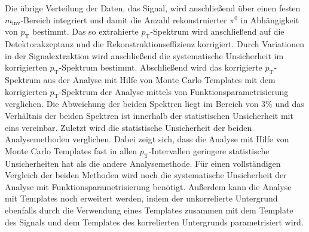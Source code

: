 Die übrige Verteilung der Daten, das Signal, wird anschließend über einen festen $m_\text{inv}$-Bereich integriert und damit die Anzahl rekonstruierter $\pi^{0}$ in Abhängigkeit von $p_\text{T}$ bestimmt.
\newline
Das so extrahierte $p_\text{T}$-Spektrum wird anschließend auf die Detektorakzeptanz und die Rekonstruktionseffizienz korrigiert.
Durch Variationen in der Signalextraktion wird anschließend die systematische Unsicherheit im korrigierten $p_\text{T}$-Spektrum bestimmt.
\newline
Abschließend wird das korrigierte $p_\text{T}$-Spektrum aus der Analyse mit Hilfe von Monte Carlo Templates mit dem korrigierten $p_\text{T}$-Spektrum der Analyse mittels von Funk\-ti\-ons\-pa\-ra\-me\-tri\-sie\-rung verglichen.
Die Abweichung der beiden Spektren liegt im Bereich von $3\%$ und das Verhältnis der beiden Spektren ist innerhalb der statistischen Unsicherheit mit eins vereinbar.
Zuletzt wird die statistische Unsicherheit der beiden Analysemethoden verglichen.
Dabei zeigt sich, dass die Analyse mit Hilfe von Monte Carlo Templates fast in allen $p_\text{T}$-Intervallen geringere statistische Unsicherheiten hat als die andere Analysemethode.
\newline
Für einen vollständigen Vergleich der beiden Methoden wird noch die systematische Unsicherheit der Analyse mit Funktionsparametrisierung benötigt.
Außerdem kann die Analyse mit Templates noch erweitert werden, indem der unkorrelierte Untergrund ebenfalls durch die Verwendung eines Templates zusammen mit dem Template des Signals und dem Templates des korrelierten Untergrunds parametrisiert wird.